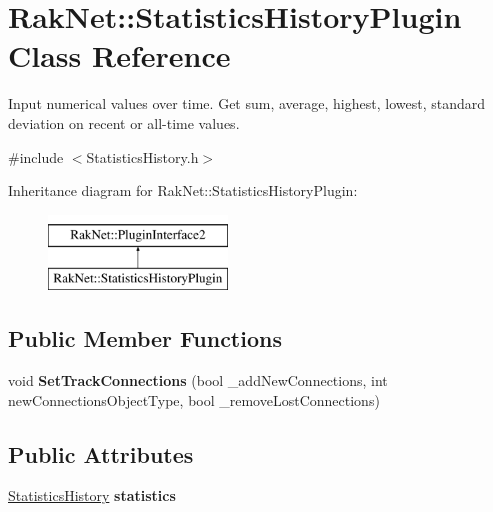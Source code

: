 \hypertarget{class_rak_net_1_1_statistics_history_plugin}{\section{Rak\-Net\-:\-:Statistics\-History\-Plugin Class Reference}
\label{class_rak_net_1_1_statistics_history_plugin}
}


Input numerical values over time. Get sum, average, highest, lowest, standard deviation on recent or all-\/time values.  




{\ttfamily \#include $<$Statistics\-History.\-h$>$}

Inheritance diagram for Rak\-Net\-:\-:Statistics\-History\-Plugin\-:\begin{figure}[H]
\begin{center}
\leavevmode
\includegraphics[height=2.000000cm]{class_rak_net_1_1_statistics_history_plugin}
\end{center}
\end{figure}
\subsection*{Public Member Functions}
\begin{DoxyCompactItemize}
\item 
\hypertarget{class_rak_net_1_1_statistics_history_plugin_a3989c3ccd836173733405fd7289cdc6e}{void {\bfseries Set\-Track\-Connections} (bool \-\_\-add\-New\-Connections, int new\-Connections\-Object\-Type, bool \-\_\-remove\-Lost\-Connections)}\label{class_rak_net_1_1_statistics_history_plugin_a3989c3ccd836173733405fd7289cdc6e}

\end{DoxyCompactItemize}
\subsection*{Public Attributes}
\begin{DoxyCompactItemize}
\item 
\hypertarget{class_rak_net_1_1_statistics_history_plugin_ac8031836361a2e7b78fbb27a7f32f6fd}{\hyperlink{class_rak_net_1_1_statistics_history}{Statistics\-History} {\bfseries statistics}}\label{class_rak_net_1_1_statistics_history_plugin_ac8031836361a2e7b78fbb27a7f32f6fd}

\end{DoxyCompactItemize}
